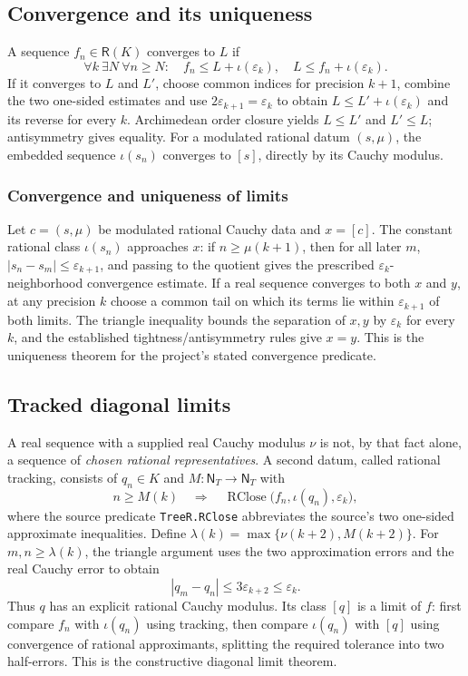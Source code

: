 \documentclass[11pt,reqno]{amsart}
\theoremstyle{definition}\newtheorem{definition}[theorem]{Definition}
\theoremstyle{remark}\newtheorem{remark}[theorem]{Remark}
\newcommand{\N}{\mathsf N_T}\newcommand{\Z}{\mathsf Z_T}\newcommand{\Q}{\mathsf Q_T}\newcommand{\RR}{\mathsf R}
\newcommand{\eps}{\varepsilon}
\begin{document}
\subsection{Convergence and its uniqueness}\label{main:sub-46}
A sequence $f_n\in\RR(K)$ converges to $L$ if
\begin{equation}\label{eq:conv}
\forall k\ \exists N\ \forall n\ge N:\quad
f_n\le L+\iota(\eps_k),\quad L\le f_n+\iota(\eps_k).
\end{equation}
If it converges to $L$ and $L'$, choose common indices for precision $k+1$, combine the two one-sided estimates and use $2\eps_{k+1}=\eps_k$ to obtain $L\le L'+\iota(\eps_k)$ and its reverse for every $k$. Archimedean order closure yields $L\le L'$ and $L'\le L$; antisymmetry gives equality. For a modulated rational datum $(s,\mu)$, the embedded sequence $\iota(s_n)$ converges to $[s]$, directly by its Cauchy modulus.


\medskip
\subsubsection*{Convergence and uniqueness of limits}\label{supp:13-1}
Let $c=(s,\mu)$ be modulated rational Cauchy data and $x=[c]$. The constant rational class $\iota(s_n)$ approaches $x$: if $n\ge\mu(k+1)$, then for all later $m$, $|s_n-s_m|\le\eps_{k+1}$, and passing to the quotient gives the prescribed $\eps_k$-neighborhood convergence estimate. If a real sequence converges to both $x$ and $y$, at any precision $k$ choose a common tail on which its terms lie within $\eps_{k+1}$ of both limits. The triangle inequality bounds the separation of $x,y$ by $\eps_k$ for every $k$, and the established tightness/antisymmetry rules give $x=y$. This is the uniqueness theorem for the project's stated convergence predicate.
\medskip

\subsection{Tracked diagonal limits}\label{main:sub-47}
A real sequence with a supplied real Cauchy modulus $\nu$ is not, by that fact alone, a sequence of \emph{chosen rational representatives}. A second datum, called rational tracking, consists of $q_n\in K$ and $M:\N\to\N$ with
\begin{equation}\label{eq:tracking}
 n\ge M(k)\quad\Longrightarrow\quad
\operatorname{RClose}\bigl(f_n,\iota(q_n),\eps_k\bigr),
\end{equation}
where the source predicate \texttt{TreeR.RClose} abbreviates the source's two one-sided approximate inequalities. Define $\lambda(k)=\max\{\nu(k+2),M(k+2)\}$. For $m,n\ge\lambda(k)$, the triangle argument uses the two approximation errors and the real Cauchy error to obtain
\[
|q_m-q_n|\le 3\eps_{k+2}\le\eps_k.
\]
Thus $q$ has an explicit rational Cauchy modulus. Its class $[q]$ is a limit of $f$: first compare $f_n$ with $\iota(q_n)$ using tracking, then compare $\iota(q_n)$ with $[q]$ using convergence of rational approximants, splitting the required tolerance into two half-errors. This is the constructive diagonal limit theorem.
\end{document}

